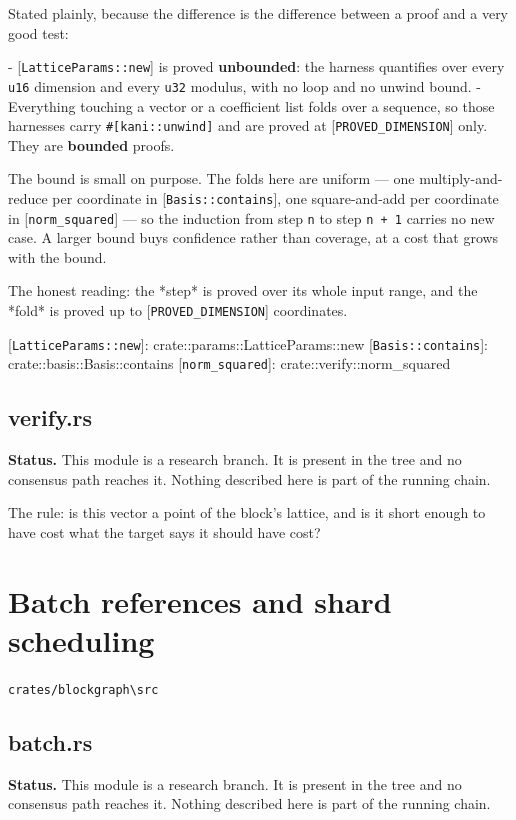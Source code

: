 \documentclass[11pt,a4paper]{article}
\begin{document}
Stated plainly, because the difference is the difference between a proof and
a very good test:

- [\texttt{LatticeParams::new}] is proved \textbf{unbounded}: the harness quantifies over
  every \texttt{u16} dimension and every \texttt{u32} modulus, with no loop and no unwind
  bound.
- Everything touching a vector or a coefficient list folds over a sequence,
  so those harnesses carry \texttt{\#[kani::unwind]} and are proved at
  [\texttt{PROVED\_DIMENSION}] only. They are \textbf{bounded} proofs.

The bound is small on purpose. The folds here are uniform — one
multiply-and-reduce per coordinate in [\texttt{Basis::contains}], one
square-and-add per coordinate in [\texttt{norm\_squared}] — so the induction from
step \texttt{n} to step \texttt{n + 1} carries no new case. A larger bound buys confidence
rather than coverage, at a cost that grows with the bound.

The honest reading: the *step* is proved over its whole input range, and the
*fold* is proved up to [\texttt{PROVED\_DIMENSION}] coordinates.

[\texttt{LatticeParams::new}]: crate::params::LatticeParams::new
[\texttt{Basis::contains}]: crate::basis::Basis::contains
[\texttt{norm\_squared}]: crate::verify::norm\_squared

\subsection{verify.rs}
\begin{framed}\noindent\textbf{Status.} This module is a research branch. It is present in the tree and no consensus path reaches it. Nothing described here is part of the running chain.\end{framed}

The rule: is this vector a point of the block's lattice, and is it short
enough to have cost what the target says it should have cost?

\section{Batch references and shard scheduling}
\noindent\texttt{crates/blockgraph\textbackslash{}src}

\subsection{batch.rs}
\begin{framed}\noindent\textbf{Status.} This module is a research branch. It is present in the tree and no consensus path reaches it. Nothing described here is part of the running chain.\end{framed}
\end{document}
